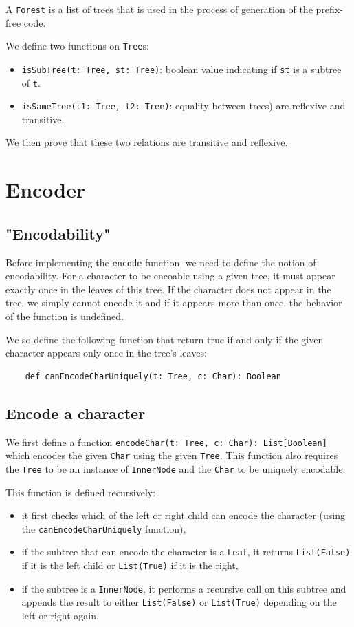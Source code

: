 \documentclass[a4paper,UKenglish,cleveref, autoref, thm-restate]{lipics-v2021}
\begin{document}
A \lstinline{Forest} is a list of trees that is used in the process of generation of the prefix-free code.

We define two functions on \lstinline{Tree}s:
\begin{itemize}
    \item \lstinline{isSubTree(t: Tree, st: Tree)}: boolean value indicating if \lstinline{st} is a subtree of \lstinline{t}.
    \item \lstinline{isSameTree(t1: Tree, t2: Tree)}: equality between trees) are reflexive and transitive.
\end{itemize}

We then prove that these two relations are transitive and reflexive.

\section{Encoder}

\subsection{"Encodability"}
Before implementing the \lstinline{encode} function, we need to define the notion of encodability. For a character to be encoable using a given tree, it must appear exactly once in the leaves of this tree. If the character does 
not appear in the tree, we simply cannot encode it and if it appears more than once, the behavior of the function is undefined.

We so define the following function that return true if and only if the given character appears only once in the tree's leaves:

\begin{lstlisting}
    def canEncodeCharUniquely(t: Tree, c: Char): Boolean
\end{lstlisting}


\subsection{Encode a character}
We first define a function \lstinline{encodeChar(t: Tree, c: Char): List[Boolean]} which encodes the given \lstinline{Char} using the given \lstinline{Tree}. This function also requires the \lstinline{Tree} to be an instance of \lstinline{InnerNode} 
and the \lstinline{Char} to be uniquely encodable.

This function is defined recursively:
\begin{itemize}
    \item it first checks which of the left or right child can encode the character (using the \lstinline{canEncodeCharUniquely} function),
    \item if the subtree that can encode the character is a \lstinline{Leaf}, it returns \lstinline{List(False)} if it is the left child or \lstinline{List(True)} if it is the right,
    \item if the subtree is a \lstinline{InnerNode}, it performs a recursive call on this subtree and appends the result to either \lstinline{List(False)} or \lstinline{List(True)} depending on the left or right again.
\end{itemize}
\end{document}
